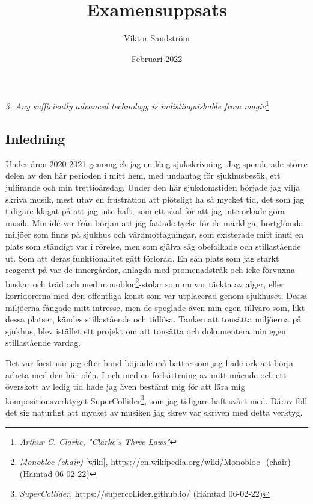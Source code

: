 \documentclass{article}
\begin{document}

\title{Examensuppsats}
\author{Viktor Sandström}
\date{Februari 2022}

\emph{
	3. Any sufficiently advanced technology is indistinguishable from magic}\footnote{\emph{Arthur C. Clarke,
"Clarke's Three Laws"}}

\subsection{Inledning}

Under åren 2020-2021 genomgick jag en lång sjukskrivning. Jag spenderade större delen av den här perioden i
mitt hem, med undantag för sjukhusbesök, ett julfirande och min trettioårsdag. Under den här sjukdomstiden
började jag vilja skriva musik, mest utav en frustration att plötsligt ha så mycket tid, det som jag tidigare
klagat på att jag inte haft, som ett skäl för att jag inte orkade göra musik. Min idé var från början att jag
fattade tycke för de märkliga, bortglömda miljöer som finns på sjukhus och vårdmottagningar, som existerade
mitt inuti en plats som ständigt var i rörelse, men som själva såg obefolkade och stillastående ut. Som att
deras funktionalitet gått förlorad. En sån plats som jag starkt reagerat på var de innergårdar, anlagda med
promenadstråk och icke förvuxna buskar och träd och med monobloc\footnote{\emph{Monobloc (chair)} [wiki],
https://en.wikipedia.org/wiki/Monobloc\_(chair) (Hämtad 06-02-22)}-stolar som nu var täckta av alger, eller 
korridorerna med den offentliga konst som var utplacerad genom sjukhuset. Dessa miljöerna fångade mitt
intresse, men de speglade även min egen tillvaro som, likt dessa platser, kändes stillastående och tidlösa.
Tanken att tonsätta miljöerna på sjukhus, blev istället ett projekt om att tonsätta och dokumentera min egen
stillastående vardag.

Det var först när jag efter hand böjrade må bättre som jag hade ork att börja arbeta med den här idén. I och 
med en förbättrning av mitt mående och ett överskott av ledig tid hade jag även bestämt mig för att lära mig
kompositionsverktyget SuperCollider\footnote{\emph{SuperCollider}, https://supercollider.github.io/ (Hämtad
06-02-22)}, som jag tidigare haft svårt med. Därav föll det sig naturligt att mycket av musiken jag skrev var
skriven med detta verktyg. 
\end{document}
